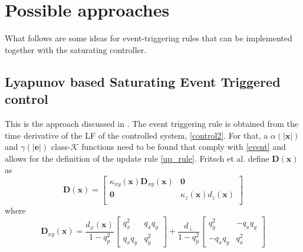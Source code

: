 \documentclass{article}
\begin{document}
	\section{Possible approaches}
		What follows are some ideas for event-triggering rules that can be implemented together with the saturating controller.
		
		\subsection{Lyapunov based Saturating Event Triggered control}
			This is the approach discussed in \cite{tabuada_event_control}. The event triggering rule is obtained from the time derivative of the LF of the controlled system, \eqref{control2}. For that, a $\alpha(|\mathbf{x}|)$ and $\gamma(|\mathbf{e}|)$ class-$\mathcal{K}$ functions need to be found that comply with \eqref{event} and allows for the definition of the update rule \eqref{up_rule}. Fritsch et al. \cite{lohmann_attitude} define $\mathbf{D(x)}$ as
			\begin{equation}
				\mathbf{D(x)} = \begin{bmatrix}
									\kappa_{xy}(\mathbf{x}) \mathbf{D}_{xy}(\mathbf{x}) &	\mathbf{0} \\
									\mathbf{0}	&	\kappa_z(\mathbf{x})d_z(\mathbf{x})\\
								\end{bmatrix}
				\label{D_mat}
			\end{equation}
			where
			\[
				\mathbf{D}_{xy}(\mathbf{x}) = \frac{d_\varphi(\mathbf{x})}{1-q_p^2} \begin{bmatrix}
																					q_x^2 & q_x q_y\\
																					q_x q_y & q_y^2
																				 \end{bmatrix}
																				 +
																				 \frac{d_\perp}{1-q_p^2} \begin{bmatrix}
																				 							q_y^2 & -q_x q_y \\
																				 							-q_x q_y & q_x^2
																				 						 \end{bmatrix}
		  \]

\end{document}
